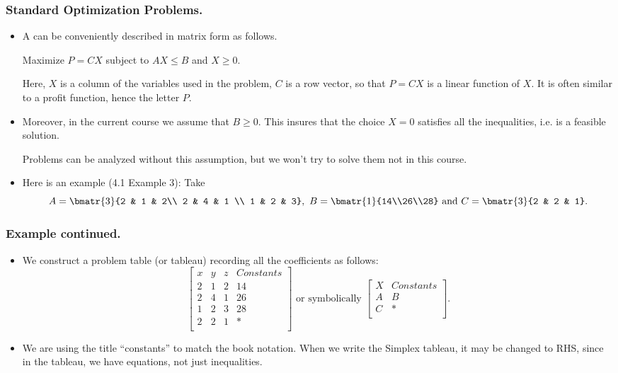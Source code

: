 \begin{frame} %

  \frametitle{Standard Optimization Problems.}
 \begin{itemize}%
\item  A  can be conveniently
described in matrix form as follows.

Maximize $P=CX$ subject to $AX\le B$ and $X\ge 0$.

Here, $X$ is a column of the variables used in the problem, $C$ is a row
vector, so that $P=CX$ is a linear function of $X$. It is often
similar to a profit function, hence the letter $P$.

\item 
Moreover, in the current course we assume that $B\ge 0$. This insures
that the choice $X=0$ satisfies all the inequalities, i.e. is a feasible
solution.

Problems can be analyzed without this assumption, but we won't try to
solve them not in this course.

\item
Here is an example (4.1 Example 3): Take
$$A=\bmatr{3}{2 & 1 & 2\\ 2 & 4 & 1 \\ 1 & 2 & 3},~
B=\bmatr{1}{14\\26\\28} \mbox{ and } C = \bmatr{3}{2 & 2 & 1}.$$


\end{itemize}
\end{frame}

%

\begin{frame}%
  \frametitle{Example continued.}
  \begin{itemize}%

\item We construct a problem table (or tableau) recording all the coefficients
as follows:
$$
\left[
\begin{array}{lll|l}
x & y & z & Constants \\\hline
2 & 1 & 2 & 14\\
2 & 4 & 1 & 26\\
1 & 2 & 3 & 28\\\hline
2 & 2 & 1 & *\\
\end{array}
\right]
\mbox{ or symbolically }
\left[
\begin{array}{l|l}
X & Constants \\\hline
A & B\\\hline
C & *\\
\end{array}
\right].
$$
\item We are using the title ``constants'' to match the book notation.
When we write the Simplex tableau, it may be changed to RHS, since in
the tableau, we have equations, not just inequalities.


\end{itemize}
\end{frame}


